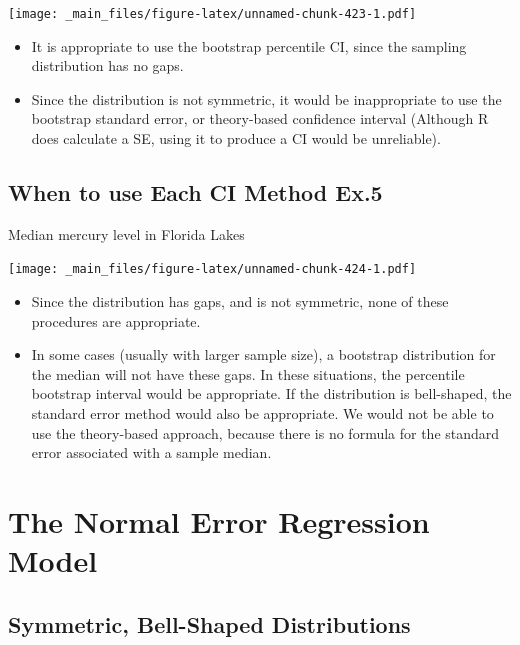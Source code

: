 \documentclass[]{book}
\providecommand{\tightlist}{%
  \setlength{\itemsep}{0pt}\setlength{\parskip}{0pt}}
\begin{document}
\texttt{[image: \_main\_files/figure-latex/unnamed-chunk-423-1.pdf]}

\begin{itemize}
\tightlist
\item
  It is appropriate to use the bootstrap percentile CI, since the
  sampling distribution has no gaps.\\
\item
  Since the distribution is not symmetric, it would be inappropriate to
  use the bootstrap standard error, or theory-based confidence interval
  (Although R does calculate a SE, using it to produce a CI would be
  unreliable).
\end{itemize}

\subsection{When to use Each CI Method
Ex.5}\label{when-to-use-each-ci-method-ex.5}

Median mercury level in Florida Lakes

\texttt{[image: \_main\_files/figure-latex/unnamed-chunk-424-1.pdf]}

\begin{itemize}
\tightlist
\item
  Since the distribution has gaps, and is not symmetric, none of these
  procedures are appropriate.\\
\item
  In some cases (usually with larger sample size), a bootstrap
  distribution for the median will not have these gaps. In these
  situations, the percentile bootstrap interval would be appropriate. If
  the distribution is bell-shaped, the standard error method would also
  be appropriate. We would not be able to use the theory-based approach,
  because there is no formula for the standard error associated with a
  sample median.
\end{itemize}

\section{The Normal Error Regression
Model}\label{the-normal-error-regression-model}

\subsection{Symmetric, Bell-Shaped
Distributions}\label{symmetric-bell-shaped-distributions}
\end{document}
